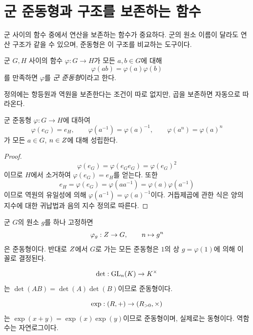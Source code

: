 \section{군 준동형과 구조를 보존하는 함수}
\label{sec:homomorphisms}

군 사이의 함수 중에서 연산을 보존하는 함수가 중요하다. 군의 원소 이름이 달라도 연산 구조가 같을 수 있으며, 준동형은 이 구조를 비교하는 도구이다.

\begin{definition}[군 준동형]
군 $G,H$ 사이의 함수 $\varphi:G\to H$가 모든 $a,b\in G$에 대해
\[
  \varphi(ab)=\varphi(a)\varphi(b)
\]
를 만족하면 $\varphi$를 \emph{군 준동형}이라고 한다.
\end{definition}

정의에는 항등원과 역원을 보존한다는 조건이 따로 없지만, 곱을 보존하면 자동으로 따라온다.

\begin{proposition}
군 준동형 $\varphi:G\to H$에 대하여
\[
  \varphi(e_G)=e_H,
  \qquad
  \varphi(a^{-1})=\varphi(a)^{-1},
  \qquad
  \varphi(a^n)=\varphi(a)^n
\]
가 모든 $a\in G$, $n\in Z$에 대해 성립한다.
\end{proposition}

\begin{proof}
\[
  \varphi(e_G)=\varphi(e_Ge_G)=\varphi(e_G)^2
\]
이므로 $H$에서 소거하여 $\varphi(e_G)=e_H$를 얻는다. 또한
\[
  e_H=\varphi(e_G)=\varphi(aa^{-1})=
  \varphi(a)\varphi(a^{-1})
\]
이므로 역원의 유일성에 의해 $\varphi(a^{-1})=\varphi(a)^{-1}$이다. 거듭제곱에 관한 식은 양의 지수에 대한 귀납법과 음의 지수 정의로 따른다.
\end{proof}

\begin{example}
군 $G$의 원소 $g$를 하나 고정하면
\[
  \varphi_g:Z\to G,\qquad n\mapsto g^n
\]
은 준동형이다. 반대로 $Z$에서 $G$로 가는 모든 준동형은 $1$의 상 $g=\varphi(1)$에 의해 이 꼴로 결정된다.
\end{example}

\begin{example}[행렬식]
\[
  \det:\operatorname{GL}_n(K)\to K^\times
\]
는 $\det(AB)=\det(A)\det(B)$이므로 준동형이다.
\end{example}

\begin{example}[지수함수]
\[
  \exp:(R,+)\to(R_{>0},\times)
\]
는 $\exp(x+y)=\exp(x)\exp(y)$이므로 준동형이며, 실제로는 동형이다. 역함수는 자연로그이다.
\end{example}

